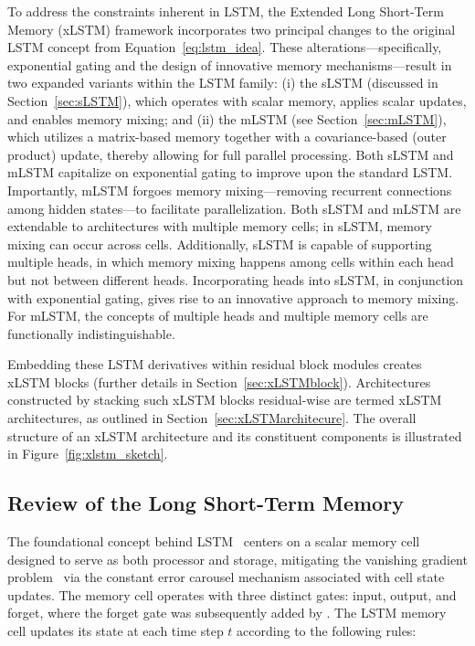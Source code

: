 To address the constraints inherent in LSTM, the Extended Long Short-Term Memory (xLSTM) framework incorporates two principal changes to the original LSTM concept from Equation~\eqref{eq:lstm_idea}. These alterations—specifically, exponential gating and the design of innovative memory mechanisms—result in two expanded variants within the LSTM family: (i) the sLSTM (discussed in Section~\ref{sec:sLSTM}), which operates with scalar memory, applies scalar updates, and enables memory mixing; and (ii) the mLSTM (see Section~\ref{sec:mLSTM}), which utilizes a matrix-based memory together with a covariance-based (outer product) update, thereby allowing for full parallel processing. Both sLSTM and mLSTM capitalize on exponential gating to improve upon the standard LSTM. Importantly, mLSTM forgoes memory mixing—removing recurrent connections among hidden states—to facilitate parallelization. Both sLSTM and mLSTM are extendable to architectures with multiple memory cells; in sLSTM, memory mixing can occur across cells. Additionally, sLSTM is capable of supporting multiple heads, in which memory mixing happens among cells within each head but not between different heads. Incorporating heads into sLSTM, in conjunction with exponential gating, gives rise to an innovative approach to memory mixing. For mLSTM, the concepts of multiple heads and multiple memory cells are functionally indistinguishable.

Embedding these LSTM derivatives within residual block modules creates xLSTM blocks (further details in Section~\ref{sec:xLSTMblock}). Architectures constructed by stacking such xLSTM blocks residual-wise are termed xLSTM architectures, as outlined in Section~\ref{sec:xLSTMarchitecure}. The overall structure of an xLSTM architecture and its constituent components is illustrated in Figure~\ref{fig:xlstm_sketch}.

\subsection{Review of the Long Short-Term Memory}
\label{sec:orgLSTM}

The foundational concept behind LSTM~\citep{Hochreiter:91,Hochreiter:97nips,Hochreiter:97} centers on a scalar memory cell designed to serve as both processor and storage, mitigating the vanishing gradient problem~\citep{Hochreiter:91,Hochreiter:00book} via the constant error carousel mechanism associated with cell state updates. The memory cell operates with three distinct gates: input, output, and forget, where the forget gate was subsequently added by \citet{Gers:00}. The LSTM memory cell updates its state at each time step $t$ according to the following rules:

